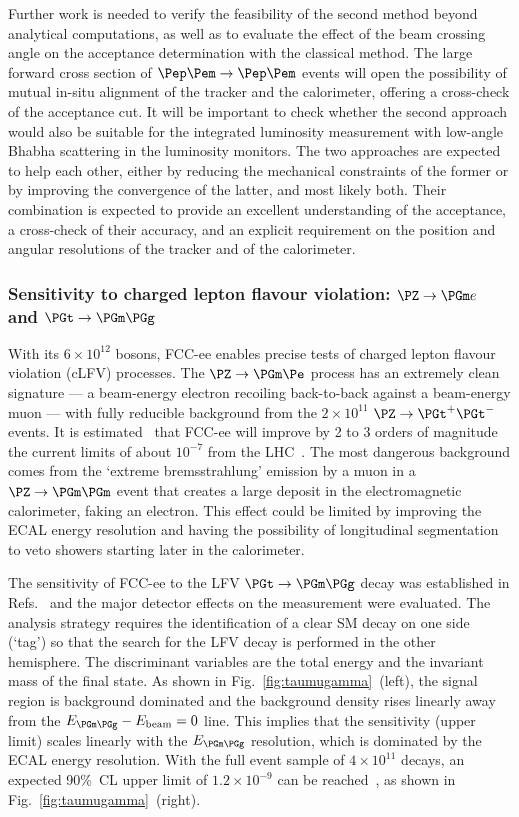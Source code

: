 Further work is needed to verify the feasibility of the second method beyond analytical computations, 
as well as to evaluate the effect of the beam crossing angle on the acceptance determination with the classical method. 
The large forward cross section of $\epem \to \epem$ events will open the possibility of mutual in-situ alignment of the tracker and the calorimeter, 
offering a cross-check of the acceptance cut. 
It will be important to check whether the second approach would also be suitable for the integrated luminosity measurement 
with low-angle Bhabha scattering in the luminosity monitors. 
The two approaches are expected to help each other, 
either by reducing the mechanical constraints of the former or by improving the convergence of the latter, and most likely both. 
Their combination is expected to provide an excellent understanding of the acceptance, 
a cross-check of their accuracy, and an explicit requirement on the position and angular resolutions of the tracker and of the calorimeter. 

\subsubsection{Sensitivity to charged lepton flavour violation: \texorpdfstring{$\PZ\to \PGm e$}{} and \texorpdfstring{$\PGt\to \PGm\PGg$}{}}

With its $6 \times 10^{12}$ \PZ bosons, FCC-ee enables precise tests of charged lepton flavour violation (cLFV) processes. 
The $\PZ \to \PGm \Pe$  process has an extremely clean signature --- a beam-energy electron recoiling back-to-back against a beam-energy muon --- 
with fully reducible background from the $2 \times 10^{11}$ $\PZ \to \PGt^+\PGt^-$ events. 
It is estimated~\cite{Dam:2021ibi} that FCC-ee will improve by 2 to 3 orders of magnitude 
the current limits of about $10^{-7}$ from the LHC~\cite{Atlas:2022uhq}. 
The most dangerous background comes from the `extreme bremsstrahlung' emission by a muon in a $\PZ \to \PGm\PGm$ event 
that creates a large deposit in the electromagnetic calorimeter, faking an electron. 
This effect could be limited by improving the ECAL energy resolution and having the possibility of longitudinal segmentation to veto showers starting later in the calorimeter. 

The sensitivity of FCC-ee to the LFV $\PGt \to \PGm \PGg$ decay was established in Refs.~\cite{Dam:2021ibi, Dam:2018rfz}
and the major detector effects on the measurement were evaluated. 
The analysis strategy requires the identification of a clear SM \PGt decay on one side (`tag') 
so that the search for the LFV decay is performed in the other hemisphere. 
The discriminant variables are the total energy and the invariant mass of the final state. 
As shown in Fig.~\ref{fig:taumugamma}~(left), the signal region is background dominated and 
the background density rises linearly away from the $E_{\PGm\PGg} - E_\text{beam}=0$ line. 
This implies that the sensitivity (upper limit) scales linearly with the $E_{\PGm\PGg}$ resolution, which is dominated by the ECAL energy resolution. 
With the full event sample of $4 \times 10^{11}$ \PGt decays, 
an expected 90\%~CL upper limit of $1.2\times 10^{-9}$ can be reached~\cite{Lusiani:2024tau}, 
as shown in Fig.~\ref{fig:taumugamma}~(right).

